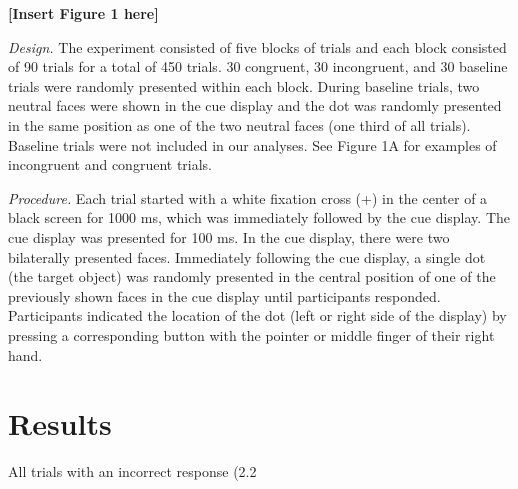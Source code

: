 \documentclass{article}
\begin{document}
	\textbf{[Insert Figure 1 here]}



	\emph{Design. }The experiment consisted of five blocks of trials and each block consisted of 90 trials for a total of 450 trials. 30 congruent, 30 incongruent, and 30 baseline trials were randomly presented within each block. During baseline trials, two neutral faces were shown in the cue display and the dot was randomly presented in the same position as one of the two neutral faces (one third of all trials). Baseline trials were not included in our analyses. See Figure 1A for examples of incongruent and congruent trials.



	\emph{Procedure. }Each trial started with a white fixation cross (+) in the center of a black screen for 1000 ms, which was immediately followed by the cue display. The cue display was presented for 100 ms. In the cue display, there were two bilaterally presented faces. Immediately following the cue display, a single dot (the target object) was randomly presented in the central position of one of the previously shown faces in the cue display until participants responded. Participants indicated the location of the dot (left or right side of the display) by pressing a corresponding button with the pointer or middle finger of their right hand.



	\section{Results}



	All trials with an incorrect response (2.2%
\end{document}
